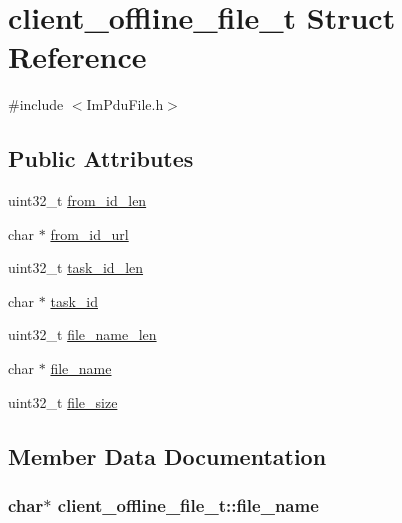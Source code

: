 \hypertarget{structclient__offline__file__t}{}\section{client\+\_\+offline\+\_\+file\+\_\+t Struct Reference}
\label{structclient__offline__file__t}


{\ttfamily \#include $<$Im\+Pdu\+File.\+h$>$}

\subsection*{Public Attributes}
\begin{DoxyCompactItemize}
\item 
uint32\+\_\+t \hyperlink{structclient__offline__file__t_a1a6200f5502550bc5f9a549058ca7dbb}{from\+\_\+id\+\_\+len}
\item 
char $\ast$ \hyperlink{structclient__offline__file__t_aab075dc01c3caab9247771e0c4709b13}{from\+\_\+id\+\_\+url}
\item 
uint32\+\_\+t \hyperlink{structclient__offline__file__t_a564d47949b2f7d73cb292d3d1166058c}{task\+\_\+id\+\_\+len}
\item 
char $\ast$ \hyperlink{structclient__offline__file__t_a2fbfffa7e5ce92b4ee0c5c494c2b581e}{task\+\_\+id}
\item 
uint32\+\_\+t \hyperlink{structclient__offline__file__t_a2de15883f000f8e91988d1a51d92be10}{file\+\_\+name\+\_\+len}
\item 
char $\ast$ \hyperlink{structclient__offline__file__t_ababe0c7a3f5090070f2c23cc8f2302f9}{file\+\_\+name}
\item 
uint32\+\_\+t \hyperlink{structclient__offline__file__t_a836fd3a13544e3d3b6cd52b8970fb7d1}{file\+\_\+size}
\end{DoxyCompactItemize}


\subsection{Member Data Documentation}
\hypertarget{structclient__offline__file__t_ababe0c7a3f5090070f2c23cc8f2302f9}{}
\subsubsection[{file\+\_\+name}]{\setlength{\rightskip}{0pt plus 5cm}char$\ast$ client\+\_\+offline\+\_\+file\+\_\+t\+::file\+\_\+name}\label{structclient__offline__file__t_ababe0c7a3f5090070f2c23cc8f2302f9}
\hypertarget{structclient__offline__file__t_a2de15883f000f8e91988d1a51d92be10}{}
